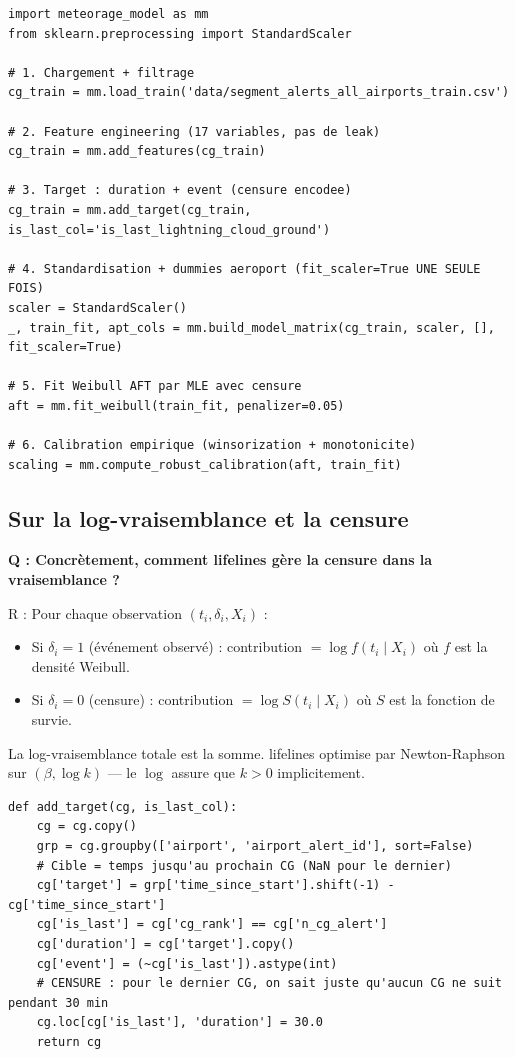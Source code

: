 \documentclass[11pt,a4paper]{article}
\begin{document}
\begin{lstlisting}[caption={Pipeline d'entrainement (extrait de meteorage\_model.py).}]
import meteorage_model as mm
from sklearn.preprocessing import StandardScaler

# 1. Chargement + filtrage
cg_train = mm.load_train('data/segment_alerts_all_airports_train.csv')

# 2. Feature engineering (17 variables, pas de leak)
cg_train = mm.add_features(cg_train)

# 3. Target : duration + event (censure encodee)
cg_train = mm.add_target(cg_train, is_last_col='is_last_lightning_cloud_ground')

# 4. Standardisation + dummies aeroport (fit_scaler=True UNE SEULE FOIS)
scaler = StandardScaler()
_, train_fit, apt_cols = mm.build_model_matrix(cg_train, scaler, [], fit_scaler=True)

# 5. Fit Weibull AFT par MLE avec censure
aft = mm.fit_weibull(train_fit, penalizer=0.05)

# 6. Calibration empirique (winsorization + monotonicite)
scaling = mm.compute_robust_calibration(aft, train_fit)
\end{lstlisting}

\subsection*{Sur la log-vraisemblance et la censure}

\begin{piege}
\textbf{Q : Concrètement, comment lifelines gère la censure dans la vraisemblance ?}

R : Pour chaque observation $(t_i, \delta_i, X_i)$ :
\begin{itemize}[topsep=2pt]
    \item Si $\delta_i = 1$ (événement observé) : contribution $= \log f(t_i \mid X_i)$
    où $f$ est la densité Weibull.
    \item Si $\delta_i = 0$ (censure) : contribution $= \log S(t_i \mid X_i)$ où $S$
    est la fonction de survie.
\end{itemize}
La log-vraisemblance totale est la somme. lifelines optimise par Newton-Raphson sur
$(\beta, \log k)$ — le $\log$ assure que $k > 0$ implicitement.
\end{piege}

\begin{lstlisting}[caption={Construction de duration + event (la \emph{ligne magique} pour la censure).}]
def add_target(cg, is_last_col):
    cg = cg.copy()
    grp = cg.groupby(['airport', 'airport_alert_id'], sort=False)
    # Cible = temps jusqu'au prochain CG (NaN pour le dernier)
    cg['target'] = grp['time_since_start'].shift(-1) - cg['time_since_start']
    cg['is_last'] = cg['cg_rank'] == cg['n_cg_alert']
    cg['duration'] = cg['target'].copy()
    cg['event'] = (~cg['is_last']).astype(int)
    # CENSURE : pour le dernier CG, on sait juste qu'aucun CG ne suit pendant 30 min
    cg.loc[cg['is_last'], 'duration'] = 30.0
    return cg
\end{lstlisting}
\end{document}
